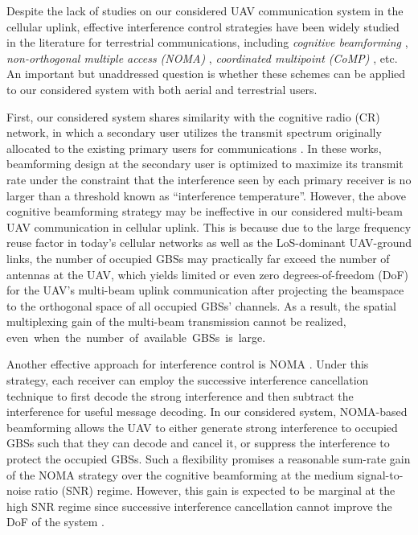 \documentclass[onecolumn, draftclsnofoot, 12pt]{IEEEtran}
\begin{document}
Despite the lack of studies on our considered UAV communication system in the cellular uplink, effective interference control strategies have been widely studied in the literature for terrestrial communications, including \emph{cognitive beamforming} \cite{Interference_Temperature,rui08}, \emph{non-orthogonal multiple access (NOMA)} \cite{NOMA,Ding}, \emph{coordinated multipoint (CoMP)} \cite{CoMP}, etc. An important but unaddressed question is whether these schemes can be applied to our considered system with both aerial and terrestrial users.

First, our considered system shares similarity with the cognitive radio (CR) network, in which a secondary user utilizes the transmit spectrum originally allocated to the existing primary users for communications \cite{Interference_Temperature,rui08}. In these works, beamforming design at the secondary user is optimized to maximize its transmit rate under the constraint that the interference seen by each primary receiver is no larger than a threshold known as ``interference temperature''. However, the above cognitive beamforming strategy may be ineffective in our considered multi-beam UAV communication in cellular uplink. This is because due to the large frequency reuse factor in today's cellular networks as well as the LoS-dominant UAV-ground links, the number of occupied GBSs may practically far exceed the number of antennas at the UAV, which yields limited or even zero degrees-of-freedom (DoF) for the UAV's multi-beam uplink communication after projecting the beamspace to the orthogonal space of all occupied GBSs' channels. As a result, the spatial multiplexing gain of the multi-beam transmission cannot be realized, {\hbox{even when the number of available GBSs is large.}}

Another effective approach for interference control is NOMA \cite{NOMA,Ding}. Under this strategy, each receiver can employ the successive interference cancellation technique to first decode the strong interference and then subtract the interference for useful message decoding. In our considered system, NOMA-based beamforming allows the UAV to either generate strong interference to occupied GBSs such that they can decode and cancel it, or suppress the interference to protect the occupied GBSs. Such a flexibility promises a reasonable sum-rate gain of the NOMA strategy over the cognitive beamforming at the medium signal-to-noise ratio (SNR) regime. However, this gain is expected to be marginal at the high SNR regime since successive interference cancellation cannot improve the DoF of the system \cite{Cover}.
\end{document}
